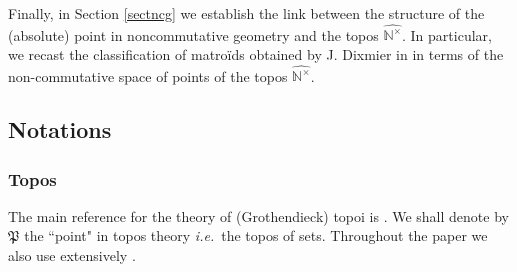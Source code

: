 \documentclass[noams,lp]{compositio}
\def\N{{\mathbb N}}
\def\pt{\mathfrak P}
\newcommand{\ie}{{\it i.e.\/}\ }
\def\wnt{{\widehat{\N^{\times}}}}
\begin{document}
Finally, in Section \ref{sectncg} we establish the link between the structure of the (absolute) point in noncommutative geometry and the topos $\wnt$. In particular, we recast the classification of matro\"ids obtained by J. Dixmier in \cite{Dixmier} in terms of the  non-commutative space  of points of the topos $\wnt$.
\subsection{Notations}

\subsubsection*{Topos}
The main reference for the theory of (Grothendieck) topoi is \cite{AGV}. We shall denote by $\pt$ the ``point" in topos theory \ie the topos of sets. Throughout the paper we also use extensively \cite{MM}. 
\end{document}
